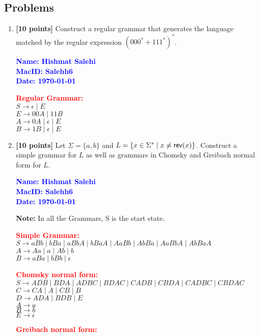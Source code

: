 \documentclass[11pt,fleqn]{article}
\newcommand{\be}{\begin{enumerate}}
\newcommand{\ee}{\end{enumerate}}
\newcommand{\mname}[1]{\mbox{\sf #1}}
\newcommand{\set}[1]{{\{ #1 \}}}
\begin{document}
\newpage

\subsection*{Problems}

\be

  \item \textbf{[10 points]} Construct a regular grammar that
    generates the language matched by the regular expression $(000^* +
    111^*)^*$.

  \bigskip

  \textcolor{blue}{\textbf{Name: Hishmat Salehi \\
MacID: Salehh6 \\
Date: \today}}

  \textcolor{red}{\textbf{Regular Grammar:}} \\
$S \rightarrow \epsilon \mid E$ \\
$E \rightarrow 00A \mid 11B$ \\
$A \rightarrow 0A \mid \epsilon \mid E$ \\
$B \rightarrow 1B \mid \epsilon \mid E$

  \item \textbf{[10 points]} Let $\Sigma = \set{a,b}$ and $L = \set{x
    \in \Sigma^* \mid x \not= \mname{rev}(x)}$.  Construct a simple
    grammar for $L$ as well as grammars in Chomsky and Greibach normal
    form for $L$.

  \bigskip

  \textcolor{blue}{\textbf{Name: Hishmat Salehi \\
MacID: Salehh6 \\
Date: \today}}

\textbf{Note:} In all the Grammars, S is the start state. 

  \textcolor{red}{\textbf{Simple Grammar:}} \\
$S \rightarrow aBb \mid bBa \mid aBbA \mid bBaA \mid AaBb \mid AbBa \mid AaBbA \mid AbBaA$ \\
$A \rightarrow Aa \mid a \mid Ab \mid b$ \\
$B \rightarrow aBa \mid bBb \mid \epsilon$ 

  \textcolor{red}{\textbf{Chomsky normal form:}} \\
$S \rightarrow ADB \mid BDA \mid ADBC \mid BDAC \mid CADB \mid CBDA \mid CADBC \mid CBDAC$ \\
$C \rightarrow CA \mid A \mid CB \mid B$ \\
$D \rightarrow ADA \mid BDB \mid E$ \\
$A \rightarrow a$ \\
$B \rightarrow b$ \\
$E \rightarrow \epsilon$ 

  \textcolor{red}{\textbf{Greibach normal form:}} \\

\ee
\end{document}
